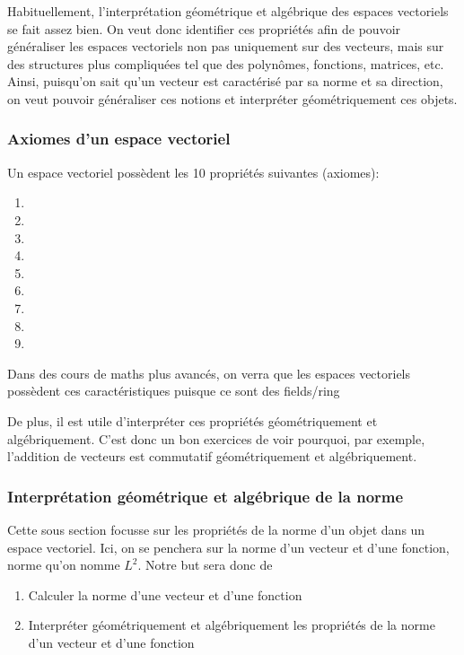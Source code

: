 \documentclass{article}
\begin{document}
Habituellement, l'interprétation géométrique et algébrique des espaces
vectoriels se fait assez bien. On veut donc identifier ces propriétés afin
de pouvoir généraliser les espaces vectoriels non pas uniquement sur des
vecteurs, mais sur des structures plus compliquées tel que des polynômes,
fonctions, matrices, etc.\\

Ainsi, puisqu'on sait qu'un vecteur est caractérisé par sa norme et sa
direction, on veut pouvoir généraliser ces notions et interpréter
géométriquement ces objets.

\subsubsection{Axiomes d'un espace vectoriel}

Un espace vectoriel possèdent les 10 propriétés suivantes (axiomes):
\begin{enumerate}
    \item
    \item
    \item
    \item
    \item
    \item
    \item
    \item
    \item
\end{enumerate}

Dans des cours de maths plus avancés, on verra que les espaces vectoriels
possèdent ces caractéristiques puisque ce sont des fields/ring

De plus, il est utile d'interpréter ces propriétés géométriquement
et algébriquement. C'est donc un bon exercices de voir pourquoi, par
exemple, l'addition de vecteurs est commutatif géométriquement et
algébriquement.

\subsubsection{Interprétation géométrique et algébrique de la norme}

Cette sous section focusse sur les propriétés de la norme d'un objet dans
un espace vectoriel. Ici, on se penchera sur la norme d'un vecteur et
d'une fonction, norme qu'on nomme $L^2$. Notre but sera donc de
\begin{enumerate}
    \item Calculer la norme d'une vecteur et d'une fonction
    \item Interpréter géométriquement et algébriquement les propriétés
	de la norme d'un vecteur et d'une fonction
\end{enumerate}
\end{document}

